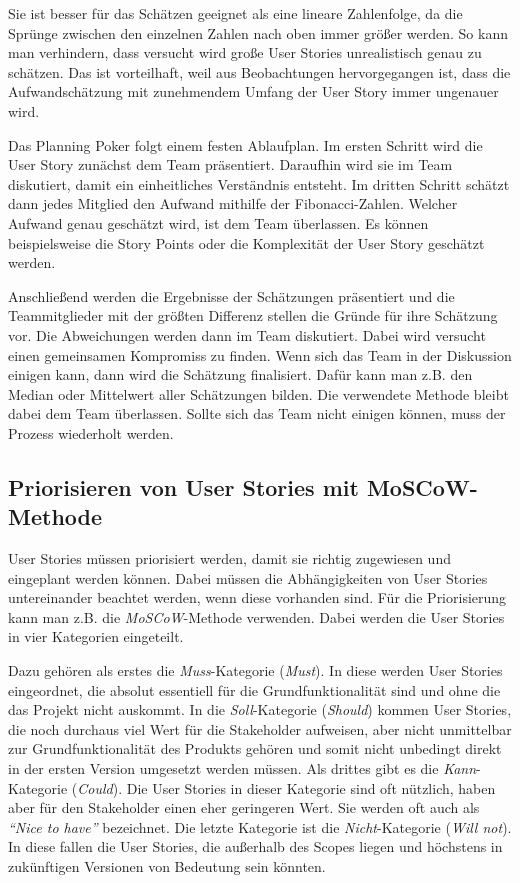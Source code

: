 \documentclass[acmtog]{acmart}
\begin{document}
Sie ist besser für das Schätzen geeignet als eine lineare Zahlenfolge, da die Sprünge zwischen den einzelnen Zahlen nach oben immer größer werden. So kann man 
verhindern, dass versucht wird große User Stories unrealistisch genau zu schätzen. Das ist vorteilhaft, weil aus Beobachtungen hervorgegangen ist, dass 
die Aufwandschätzung mit zunehmendem Umfang der User Story immer ungenauer wird. \cite{planingpoker}

Das Planning Poker folgt einem festen Ablaufplan. Im ersten Schritt wird die User Story zunächst dem Team präsentiert. Daraufhin wird sie im Team diskutiert, 
damit ein einheitliches Verständnis entsteht. Im dritten Schritt schätzt dann jedes Mitglied den Aufwand mithilfe der Fibonacci-Zahlen. Welcher Aufwand genau 
geschätzt wird, ist dem Team überlassen. Es können beispielsweise die Story Points oder die Komplexität der User Story geschätzt werden. \cite{planingpoker}

Anschließend werden die Ergebnisse der Schätzungen präsentiert und die Teammitglieder mit der größten Differenz stellen die Gründe für ihre Schätzung vor. 
Die Abweichungen werden dann im Team diskutiert. Dabei wird versucht einen gemeinsamen Kompromiss zu finden. Wenn sich das Team in der Diskussion einigen kann, dann wird die Schätzung finalisiert. 
Dafür kann man z.B. den Median oder Mittelwert aller Schätzungen bilden. Die verwendete Methode bleibt dabei dem Team überlassen. Sollte sich das Team nicht einigen können, muss der Prozess wiederholt werden. \cite{planingpoker}

\subsection{Priorisieren von User Stories mit MoSCoW-Methode} \label{sec:priorization}

User Stories müssen priorisiert werden, damit sie richtig zugewiesen und eingeplant werden können. Dabei müssen die Abhängigkeiten von User Stories untereinander 
beachtet werden, wenn diese vorhanden sind. Für die Priorisierung kann man z.B. die \emph{MoSCoW}-Methode verwenden. Dabei werden die User Stories in vier Kategorien eingeteilt. \cite{moscow}

Dazu gehören als erstes die \emph{Muss}-Kategorie (\emph{Must}). In diese werden User Stories eingeordnet, die absolut essentiell für die Grundfunktionalität sind und ohne die das 
Projekt nicht auskommt. In die \emph{Soll}-Kategorie (\emph{Should}) kommen User Stories, die noch durchaus viel Wert für die Stakeholder aufweisen, aber nicht unmittelbar zur Grundfunktionalität 
des Produkts gehören und somit nicht unbedingt direkt in der ersten Version umgesetzt werden müssen. Als drittes gibt es die \emph{Kann}-Kategorie (\emph{Could}). Die User Stories in dieser Kategorie sind oft 
nützlich, haben aber für den Stakeholder einen eher geringeren Wert. Sie werden oft auch als \emph{``Nice to have''} bezeichnet. Die letzte Kategorie ist die \emph{Nicht}-Kategorie 
(\emph{Will not}). In diese fallen die User Stories, die außerhalb des Scopes liegen und höchstens in zukünftigen Versionen von Bedeutung sein könnten. \cite{moscow}
\end{document}
